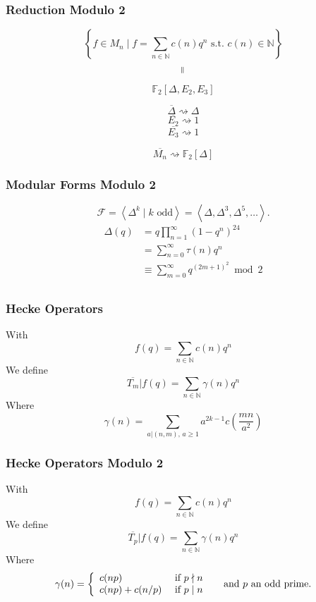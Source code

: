 \documentclass[12pt]{beamer}
\begin{document}
	\begin{frame}
		\frametitle{Reduction Modulo 2}
		$$\left\lbrace f \in M_n \mid f = \sum_{n \in \mathbb{N}} c(n)q^n \text{ s.t. } c(n) \in \mathbb{N} \right\rbrace$$
		$$\rotatebox{90}{$=$}$$
		$$\mathbb{F}_2\left[ \Delta, E_2, E_3 \right]$$
		
		$$\overline{\Delta} \rightsquigarrow \Delta$$
		$$\overline{E_2} \rightsquigarrow 1$$
		$$\overline{E_3} \rightsquigarrow 1$$
		
		$$\overline{M_n} \rightsquigarrow \mathbb{F}_2 \left[ \Delta \right]$$
	\end{frame}

	\begin{frame}
		\frametitle{Modular Forms Modulo 2}
		$$
		\mathcal{F}
		= \left\langle \Delta^k \mid k \text{ odd} \right\rangle
		= \left\langle \Delta, \Delta^3, \Delta^5, \dots \right\rangle.
		$$
		\begin{align*}
			\Delta(q)
			&= q \prod_{n=1}^{\infty} (1-q^n)^{24}\\
			&= \sum_{n=0}^{\infty} \tau(n)q^n\\
			&\equiv \sum_{m=0}^{\infty} q^{(2m+1)^2} \bmod 2\\
		\end{align*}
	\end{frame}
	
	\begin{frame}
		\frametitle{Hecke Operators}
		With
		$$
		f(q) = \sum_{n \in \mathbb{N}} c(n)q^n
		$$
		We define
		$$
		\overline{T_m}|f(q) = \sum_{n \in \mathbb{N}} \gamma(n)q^n
		$$
		Where
		$$
		\gamma(n) = \sum_{a | (n,m),\, a \geq 1} a^{2k-1} c\left( \frac{mn}{a^2} \right)
		$$
	\end{frame}
	\begin{frame}
		\frametitle{Hecke Operators Modulo 2}
		With
		$$
		f(q) = \sum_{n \in \mathbb{N}} c(n)q^n
		$$
		We define
		$$
		\overline{T_p}|f(q) = \sum_{n \in \mathbb{N}} \gamma(n)q^n
		$$
		Where
		$$
		\gamma(n) = 
		\left\lbrace
		\begin{array}{l l}
		c(np)        & \text{ if } p \nmid n \\
		c(np)+c(n/p) & \text{ if } p \mid  n
		\end{array}
		\right. 
		\quad \text{ and } p \text{ an odd prime}.
		$$
	\end{frame}
\end{document}
